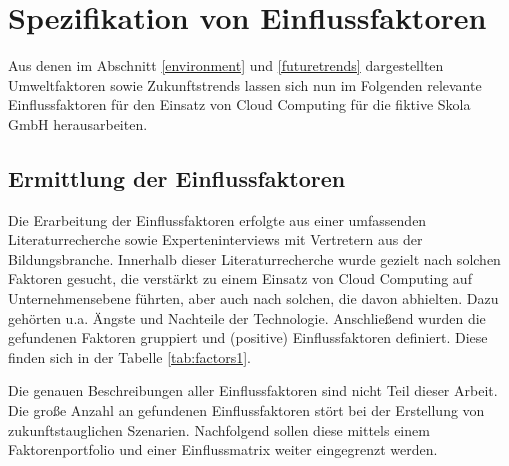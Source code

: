 \section{Spezifikation von Einflussfaktoren}
\label{influencingfactors}

Aus denen im Abschnitt \ref{environment} und \ref{futuretrends} dargestellten Umweltfaktoren sowie Zukunftstrends lassen sich nun im Folgenden relevante Einflussfaktoren für den Einsatz von Cloud Computing für die fiktive Skola GmbH herausarbeiten.

\subsection{Ermittlung der Einflussfaktoren}

Die Erarbeitung der Einflussfaktoren erfolgte aus einer umfassenden Literaturrecherche sowie Experteninterviews mit Vertretern aus der Bildungsbranche. Innerhalb dieser Literaturrecherche wurde gezielt nach solchen Faktoren gesucht, die verstärkt zu einem Einsatz von Cloud Computing auf Unternehmensebene führten, aber auch nach solchen, die davon abhielten. Dazu gehörten u.a. Ängste und Nachteile der Technologie. Anschließend wurden die gefundenen Faktoren gruppiert und (positive) Einflussfaktoren definiert. Diese finden sich in der Tabelle \ref{tab:factors1}.

Die genauen Beschreibungen aller Einflussfaktoren sind nicht Teil dieser Arbeit. Die große Anzahl an gefundenen Einflussfaktoren stört bei der Erstellung von zukunftstauglichen Szenarien. Nachfolgend sollen diese mittels einem Faktorenportfolio und einer Einflussmatrix weiter eingegrenzt werden.

